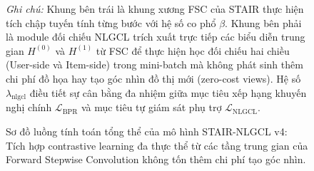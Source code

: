 \begin{figure}[H]
\caption{Sơ đồ luồng tính toán tổng thể của mô hình STAIR-NLGCL v4: Tích hợp contrastive learning đa thực thể từ các tầng trung gian của Forward Stepwise Convolution không tốn thêm chi phí tạo góc nhìn.}
\label{fig:stair_nlgcl_v4_architecture}
\vspace{4pt}
\begin{minipage}{0.95\textwidth}
\footnotesize\textit{Ghi chú:} Khung bên trái là khung xương FSC của STAIR thực hiện tích chập tuyến tính từng bước với hệ số co phổ $\beta$. Khung bên phải là module đối chiếu NLGCL trích xuất trực tiếp các biểu diễn trung gian $H^{(0)}$ và $H^{(1)}$ từ FSC để thực hiện học đối chiếu hai chiều (User-side và Item-side) trong mini-batch mà không phát sinh thêm chi phí đồ họa hay tạo góc nhìn đồ thị mới (zero-cost views). Hệ số $\lambda_{\text{nlgcl}}$ điều tiết sự cân bằng đa nhiệm giữa mục tiêu xếp hạng khuyến nghị chính $\mathcal{L}_{\text{BPR}}$ và mục tiêu tự giám sát phụ trợ $\mathcal{L}_{\text{NLGCL}}$.
\end{minipage}
\end{figure}

